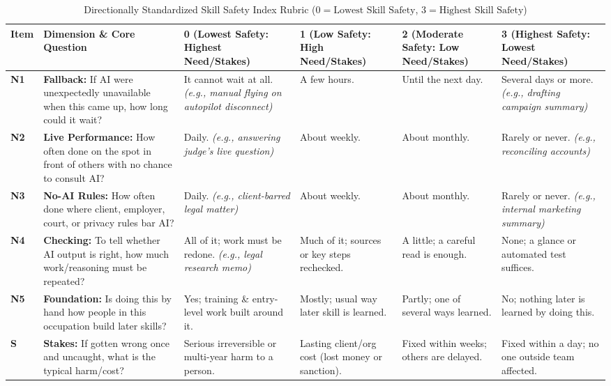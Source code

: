 \documentclass[9pt,letterpaper]{extarticle}
\begin{document}
\begin{table}[h!]
\centering
\caption{Directionally Standardized Skill Safety Index Rubric ($0 = \text{Lowest Skill Safety}$, $3 = \text{Highest Skill Safety}$)}
\label{tab:rubric}
\scriptsize
\begin{tabularx}{\textwidth}{@{}p{0.38in}p{1.95in}XXXX@{}}
\toprule
\textbf{Item} & \textbf{Dimension \& Core Question} & \textbf{0 (Lowest Safety: Highest Need/Stakes)} & \textbf{1 (Low Safety: High Need/Stakes)} & \textbf{2 (Moderate Safety: Low Need/Stakes)} & \textbf{3 (Highest Safety: Lowest Need/Stakes)} \\
\midrule
\textbf{N1} & \textbf{Fallback:} If AI were unexpectedly unavailable when this came up, how long could it wait? & It cannot wait at all. \emph{(e.g., manual flying on autopilot disconnect)} & A few hours. & Until the next day. & Several days or more. \emph{(e.g., drafting campaign summary)} \\
\addlinespace[1.2pt]
\textbf{N2} & \textbf{Live Performance:} How often done on the spot in front of others with no chance to consult AI? & Daily. \emph{(e.g., answering judge's live question)} & About weekly. & About monthly. & Rarely or never. \emph{(e.g., reconciling accounts)} \\
\addlinespace[1.2pt]
\textbf{N3} & \textbf{No-AI Rules:} How often done where client, employer, court, or privacy rules bar AI? & Daily. \emph{(e.g., client-barred legal matter)} & About weekly. & About monthly. & Rarely or never. \emph{(e.g., internal marketing summary)} \\
\addlinespace[1.2pt]
\textbf{N4} & \textbf{Checking:} To tell whether AI output is right, how much work/reasoning must be repeated? & All of it; work must be redone. \emph{(e.g., legal research memo)} & Much of it; sources or key steps rechecked. & A little; a careful read is enough. & None; a glance or automated test suffices. \\
\addlinespace[1.2pt]
\textbf{N5} & \textbf{Foundation:} Is doing this by hand how people in this occupation build later skills? & Yes; training \& entry-level work built around it. & Mostly; usual way later skill is learned. & Partly; one of several ways learned. & No; nothing later is learned by doing this. \\
\addlinespace[1.2pt]
\textbf{S} & \textbf{Stakes:} If gotten wrong once and uncaught, what is the typical harm/cost? & Serious irreversible or multi-year harm to a person. & Lasting client/org cost (lost money or sanction). & Fixed within weeks; others are delayed. & Fixed within a day; no one outside team affected. \\
\bottomrule
\end{tabularx}
\end{table}
\end{document}
